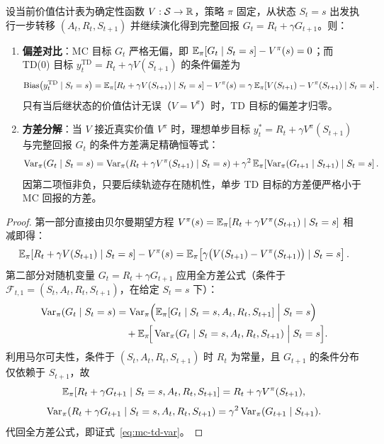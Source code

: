 \begin{thmBox}
\begin{proposition}
\label{prop:mc-td-bv}
设当前价值估计表为确定性函数 $V: \mathcal{S} \to \mathbb{R}$，策略 $\pi$ 固定，从状态 $S_t = s$ 出发执行一步转移 $(A_t, R_t, S_{t+1})$ 并继续演化得到完整回报 $G_t = R_t + \gamma G_{t+1}$。则：
\begin{enumerate}
  \item \textbf{偏差对比}：MC 目标 $G_t$ 严格无偏，即 $\mathbb{E}_\pi[G_t \mid S_t = s] - V^\pi(s) = 0$；而 TD(0) 目标 $y_t^{\mathrm{TD}} = R_t + \gamma V(S_{t+1})$ 的条件偏差为
  \begin{equation}
    \operatorname{Bias}\!\left(y_t^{\mathrm{TD}} \mid S_t = s\right)
    = \mathbb{E}_\pi\!\left[R_t + \gamma V(S_{t+1}) \mid S_t = s\right] - V^\pi(s)
    = \gamma\, \mathbb{E}_\pi\!\left[V(S_{t+1}) - V^\pi(S_{t+1}) \mid S_t = s\right].
    \label{eq:td-bias}
  \end{equation}
  只有当后继状态的价值估计无误（$V = V^\pi$）时，TD 目标的偏差才归零。
  \item \textbf{方差分解}：当 $V$ 接近真实价值 $V^\pi$ 时，理想单步目标 $y_t^* = R_t + \gamma V^\pi(S_{t+1})$ 与完整回报 $G_t$ 的条件方差满足精确恒等式：
  \begin{equation}
    \operatorname{Var}_\pi\!\left(G_t \mid S_t = s\right)
    = \operatorname{Var}_\pi\!\left(R_t + \gamma V^\pi(S_{t+1}) \mid S_t = s\right)
    + \gamma^2\, \mathbb{E}_\pi\!\left[\operatorname{Var}_\pi(G_{t+1} \mid S_{t+1}) \mid S_t = s\right].
    \label{eq:mc-td-var}
  \end{equation}
  因第二项恒非负，只要后续轨迹存在随机性，单步 TD 目标的方差便严格小于 MC 回报的方差。
\end{enumerate}
\end{proposition}
\begin{proof}
第一部分直接由贝尔曼期望方程 $V^\pi(s) = \mathbb{E}_\pi[R_t + \gamma V^\pi(S_{t+1}) \mid S_t = s]$ 相减即得：
\[
  \mathbb{E}_\pi\!\left[R_t + \gamma V(S_{t+1}) \mid S_t = s\right] - V^\pi(s)
  = \mathbb{E}_\pi\!\left[\gamma\big(V(S_{t+1}) - V^\pi(S_{t+1})\big) \mid S_t = s\right].
\]
第二部分对随机变量 $G_t = R_t + \gamma G_{t+1}$ 应用全方差公式（条件于 $\mathcal{F}_{t,1} = (S_t, A_t, R_t, S_{t+1})$，在给定 $S_t = s$ 下）：
\begin{align*}
  \operatorname{Var}_\pi(G_t \mid S_t = s)
  &= \operatorname{Var}_\pi\!\Big(\mathbb{E}_\pi[G_t \mid S_t = s, A_t, R_t, S_{t+1}] \;\Big|\; S_t = s\Big) \\
  &\quad + \mathbb{E}_\pi\!\Big[\operatorname{Var}_\pi(G_t \mid S_t = s, A_t, R_t, S_{t+1}) \;\Big|\; S_t = s\Big].
\end{align*}
利用马尔可夫性，条件于 $(S_t, A_t, R_t, S_{t+1})$ 时 $R_t$ 为常量，且 $G_{t+1}$ 的条件分布仅依赖于 $S_{t+1}$，故
\[
  \mathbb{E}_\pi[R_t + \gamma G_{t+1} \mid S_t = s, A_t, R_t, S_{t+1}] = R_t + \gamma V^\pi(S_{t+1}),
\]
\[
  \operatorname{Var}_\pi(R_t + \gamma G_{t+1} \mid S_t = s, A_t, R_t, S_{t+1}) = \gamma^2 \operatorname{Var}_\pi(G_{t+1} \mid S_{t+1}).
\]
代回全方差公式，即证式~\eqref{eq:mc-td-var}。
\end{proof}
\end{thmBox}

